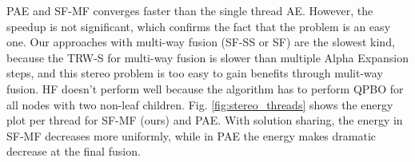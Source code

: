 PAE and SF-MF converges faster than the single thread AE. However, the
speedup is not significant, which confirms the fact that the problem
is an easy one.
Our approaches with multi-way fusion (SF-SS or SF) are the slowest
kind, because the TRW-S for multi-way fusion is slower than multiple
Alpha Expansion steps, and this stereo problem is too easy to gain
benefits through mulit-way fusion. HF doesn't perform well because the
algorithm has to perform QPBO for all nodes with two non-leaf
children.
%
%
%
%
Fig. \ref{fig:stereo_threads} shows the energy plot per thread for
SF-MF (ours) and PAE. With solution sharing, the energy in SF-MF
decreases more uniformly, while in PAE the energy makes dramatic
decrease at the final fusion.
%

